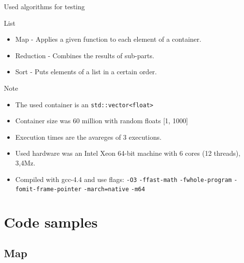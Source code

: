 \documentclass{beamer}
\begin{document}

\begin{frame}[fragile]{Used algorithms for testing}

\begin{block}{List}
\begin{itemize}
  \item Map - Applies a given function to each element of a container.
  \item Reduction - Combines the results of sub-parts.
  \item Sort - Puts elements of a list in a certain order.
\end{itemize}
\end{block}

\begin{exampleblock}{Note}
\small
\begin{itemize}
  \item The used container is an \verb|std::vector<float>|
  \item Container size was 60 million with random floats [1, 1000]
  \item Execution times are the avareges of 3 executions.
  \item Used hardware was an Intel Xeon 64-bit machine with 6 cores (12 threads), 3,4Mz.
  \item Compiled with gcc-4.4 and use flags: \verb|-O3| \verb|-ffast-math| \verb|-fwhole-program| 
\verb|-fomit-frame-pointer| \verb|-march=native| \verb|-m64|
\end{itemize}
\end{exampleblock}
      

\end{frame}


\section{Code samples}

\subsection{Map}

\end{document}
